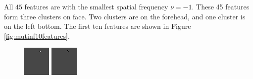 All $45$ features are with the smallest spatial frequency $\nu=-1$. These 45 features form three clusters on face. Two clusters are on the forehead, and one cluster is on the left bottom. The first ten features are shown in \mbox{Figure} \ref{fig:mutinf10features}.
\begin{figure}[ht]
 \begin{center}
  \includegraphics[width=\columnwidth/11]{ch5/figures/mutinf_01.png}
  \includegraphics[width=\columnwidth/11]{ch5/figures/mutinf_02.png}

\end{center}
\end{figure}
